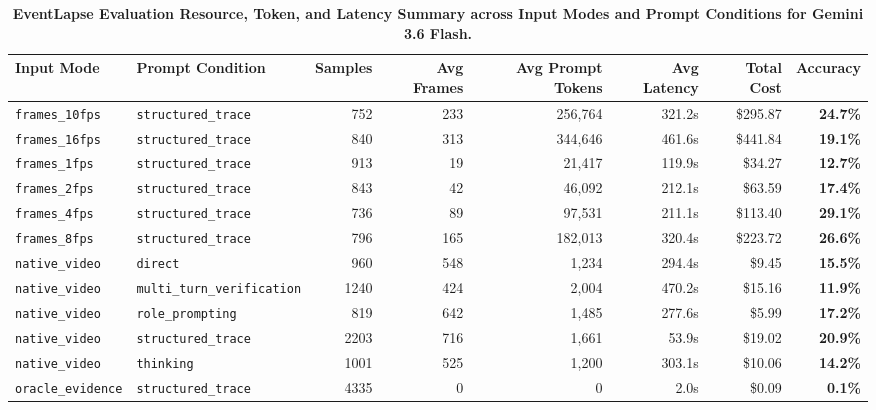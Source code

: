 \begin{table}[t]
\centering
\small
\caption{\textbf{EventLapse Evaluation Resource, Token, and Latency Summary across Input Modes and Prompt Conditions for Gemini 3.6 Flash.}}
\label{tab:resource_summary}
\begin{tabular}{llrrrrrr}
\toprule
\textbf{Input Mode} & \textbf{Prompt Condition} & \textbf{Samples} & \textbf{Avg Frames} & \textbf{Avg Prompt Tokens} & \textbf{Avg Latency} & \textbf{Total Cost} & \textbf{Accuracy} \\
\midrule
\texttt{frames_10fps} & \texttt{structured_trace} & 752 & 233 & 256,764 & 321.2s & \$295.87 & \textbf{24.7\%} \\
\texttt{frames_16fps} & \texttt{structured_trace} & 840 & 313 & 344,646 & 461.6s & \$441.84 & \textbf{19.1\%} \\
\texttt{frames_1fps} & \texttt{structured_trace} & 913 & 19 & 21,417 & 119.9s & \$34.27 & \textbf{12.7\%} \\
\texttt{frames_2fps} & \texttt{structured_trace} & 843 & 42 & 46,092 & 212.1s & \$63.59 & \textbf{17.4\%} \\
\texttt{frames_4fps} & \texttt{structured_trace} & 736 & 89 & 97,531 & 211.1s & \$113.40 & \textbf{29.1\%} \\
\texttt{frames_8fps} & \texttt{structured_trace} & 796 & 165 & 182,013 & 320.4s & \$223.72 & \textbf{26.6\%} \\
\texttt{native_video} & \texttt{direct} & 960 & 548 & 1,234 & 294.4s & \$9.45 & \textbf{15.5\%} \\
\texttt{native_video} & \texttt{multi_turn_verification} & 1240 & 424 & 2,004 & 470.2s & \$15.16 & \textbf{11.9\%} \\
\texttt{native_video} & \texttt{role_prompting} & 819 & 642 & 1,485 & 277.6s & \$5.99 & \textbf{17.2\%} \\
\texttt{native_video} & \texttt{structured_trace} & 2203 & 716 & 1,661 & 53.9s & \$19.02 & \textbf{20.9\%} \\
\texttt{native_video} & \texttt{thinking} & 1001 & 525 & 1,200 & 303.1s & \$10.06 & \textbf{14.2\%} \\
\texttt{oracle_evidence} & \texttt{structured_trace} & 4335 & 0 & 0 & 2.0s & \$0.09 & \textbf{0.1\%} \\
\bottomrule
\end{tabular}
\end{table}
